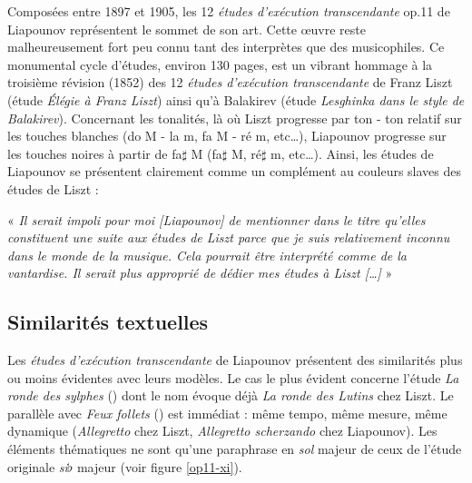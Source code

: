 Composées entre 1897 et 1905, les 12 \emph{études d'exécution transcendante} op.11 de Liapounov représentent le sommet de son art. Cette œuvre reste malheureusement fort peu connu tant des interprètes que des musicophiles. Ce monumental cycle d'études, environ 130 pages, est un vibrant hommage à la troisième révision (1852) des 12 \emph{études d'exécution transcendante} de Franz Liszt (étude  \emph{Élégie à Franz Liszt}) ainsi qu'à Balakirev (étude  \emph{Lesghinka dans le style de Balakirev}). Concernant les tonalités, là où Liszt progresse par ton - ton relatif sur les touches blanches (do M - la m, fa M - ré m, etc\dots), Liapounov progresse sur les touches noires à partir de fa$\sharp$ M (fa$\sharp$ M, ré$\sharp$ m, etc\dots). Ainsi, les études de Liapounov se présentent clairement comme un complément au couleurs slaves des études de Liszt :

« \emph{Il serait impoli pour moi [Liapounov] de mentionner dans le titre qu'elles constituent une suite aux études de Liszt parce que je suis relativement inconnu dans le monde de la musique. Cela pourrait être interprété comme de la vantardise. Il serait plus approprié de dédier mes études à Liszt [\dots]} »\\

\subsection{Similarités textuelles}

Les \emph{études d'exécution transcendante} de Liapounov présentent des similarités plus ou moins évidentes avec leurs modèles. Le cas le plus évident concerne l'étude \emph{La ronde des sylphes} () dont le nom évoque déjà \emph{La ronde des Lutins} chez Liszt. Le parallèle avec \emph{Feux follets} () est immédiat : même tempo, même mesure, même dynamique (\emph{Allegretto} chez Liszt, \emph{Allegretto scherzando} chez Liapounov). Les éléments thématiques ne sont qu'une paraphrase en \emph{sol} majeur de ceux de l'étude originale \emph{si}$\flat$ majeur (voir figure \ref{op11-xi}).

